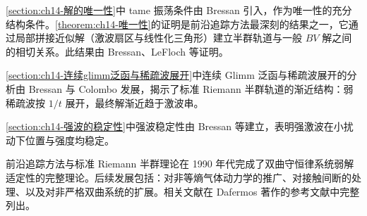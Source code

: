 \documentclass[../../main.tex]{subfiles}
\begin{document}
\cref{section:ch14-解的唯一性}中 tame 振荡条件由 Bressan 引入，作为唯一性的充分结构条件。\cref{theorem:ch14-唯一性}的证明是前沿追踪方法最深刻的结果之一，它通过局部拼接近似解（激波扇区与线性化三角形）建立半群轨道与一般 $BV$ 解之间的相切关系。此结果由 Bressan、LeFloch 等证明。

\cref{section:ch14-连续glimm泛函与稀疏波展开}中连续 Glimm 泛函与稀疏波展开的分析由 Bressan 与 Colombo 发展，揭示了标准 Riemann 半群轨道的渐近结构：弱稀疏波按 $1/t$ 展开，最终解渐近趋于激波串。

\cref{section:ch14-强波的稳定性}中强波稳定性由 Bressan 等建立，表明强激波在小扰动下位置与强度均稳定。

前沿追踪方法与标准 Riemann 半群理论在 1990 年代完成了双曲守恒律系统弱解适定性的完整理论。后续发展包括：对非等熵气体动力学的推广、对接触间断的处理、以及对非严格双曲系统的扩展。相关文献在 Dafermos 著作的参考文献中完整列出。
\end{document}
